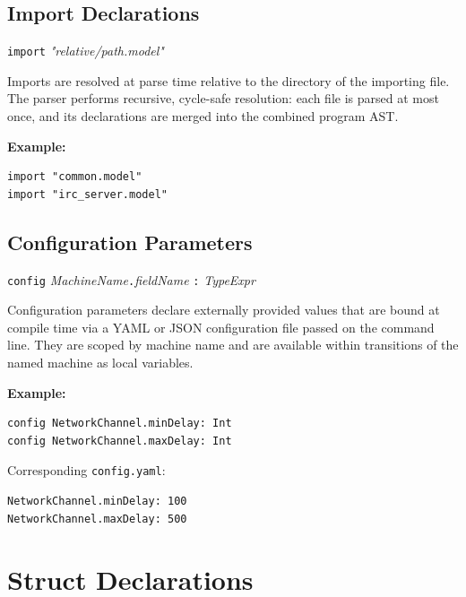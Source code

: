 \documentclass[11pt,letterpaper]{article}
\begin{document}
\subsection{Import Declarations}
\label{sec:imports}

\begin{syntaxbox}[import]
\texttt{import} \textit{"relative/path.model"}
\end{syntaxbox}

Imports are resolved at parse time relative to the directory of the
importing file.  The parser performs recursive, cycle-safe resolution:
each file is parsed at most once, and its declarations are merged into
the combined program AST.

\textbf{Example:}
\begin{lstlisting}[numbers=none]
import "common.model"
import "irc_server.model"
\end{lstlisting}

\subsection{Configuration Parameters}
\label{sec:config}

\begin{syntaxbox}[config]
\texttt{config} \textit{MachineName}\texttt{.}\textit{fieldName} \texttt{:} \textit{TypeExpr}
\end{syntaxbox}

Configuration parameters declare externally provided values that are
bound at compile time via a YAML or JSON configuration file passed on
the command line.  They are scoped by machine name and are available
within transitions of the named machine as local variables.

\textbf{Example:}
\begin{lstlisting}[numbers=none]
config NetworkChannel.minDelay: Int
config NetworkChannel.maxDelay: Int
\end{lstlisting}

Corresponding \texttt{config.yaml}:
\begin{lstlisting}[language=bash,numbers=none]
NetworkChannel.minDelay: 100
NetworkChannel.maxDelay: 500
\end{lstlisting}


\section{Struct Declarations}
\label{sec:structs}
\end{document}
